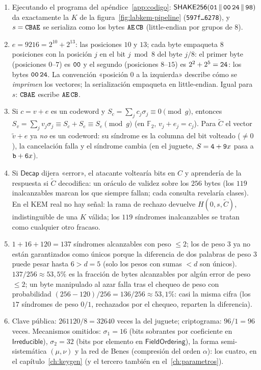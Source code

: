 \documentclass[11pt,a4paper,oneside]{report}
\newcommand{\F}{\mathbb{F}}
\newcommand{\Ftwo}{\F_2}
\newcommand{\hx}[1]{\text{\texttt{#1}}}
\begin{document}
\begin{enumerate}[leftmargin=1.9em,itemsep=4pt]
  \item Ejecutando el programa del apéndice~\ref{app:codigo}:
        $\textsf{SHAKE256}(\hx{01}\,\|\,\hx{00\,24}\,\|\,\hx{98})$
        da exactamente la $K$ de la
        figura~\ref{fig:labkem-pipeline}
        (\texttt{597f\ldots6278}), y $s=\hx{CBAE}$ se serializa
        como los bytes $\hx{AE}\,\hx{CB}$ (little-endian por grupos
        de $8$).
  \item $e=9216=2^{10}+2^{13}$: las posiciones $10$ y $13$; cada
        byte empaqueta $8$ posiciones con la posición $j$ en el bit
        $j\bmod8$ del byte $j/8$: el primer byte
        (posiciones $0$--$7$) es $\hx{00}$ y el segundo
        (posiciones $8$--$15$) es $2^2+2^5=\hx{24}$: los bytes
        $\hx{00}\,\hx{24}$. La convención «posición $0$ a la
        izquierda» describe cómo se \emph{imprimen} los vectores;
        la serialización empaqueta en little-endian. Igual para
        $s$: $\hx{CBAE}$ escribe $\hx{AE}\,\hx{CB}$.
  \item Si $c=v+e$ es un codeword y $S_c=\sum_jc_j\sigma_j\equiv0
        \pmod g$, entonces
        $S_v=\sum_jv_j\sigma_j\equiv S_c+S_e\equiv S_e\pmod g$
        (en $\Ftwo$, $v_j+e_j=c_j$). Para $\tilde C$ el vector
        $\tilde v+e$ ya \emph{no} es un codeword: su síndrome es la
        columna del bit volteado ($\ne0$), la cancelación falla y el
        síndrome cambia (en el juguete, $S=\hx4+\hx9x$ pasa a
        $\hx b+\hx6x$).
  \item Si $\textsf{Decap}$ dijera «error», el atacante voltearía
        bits en $C$ y aprendería de la respuesta si $\tilde C$
        decodifica: un oráculo de validez sobre los $256$ bytes
        (los $119$ inalcanzables marcan los que siempre fallan; cada
        consulta revelaría clases). En el KEM real no hay señal: la
        rama de rechazo devuelve $H(0,s,\tilde C)$, indistinguible
        de una $K$ válida; los $119$ síndromes inalcanzables se
        tratan como cualquier otro fracaso.
  \item $1+16+120=137$ síndromes alcanzables con peso $\le2$; los de
        peso $3$ ya no están garantizados como únicos porque la
        diferencia de dos palabras de peso $3$ puede pesar hasta
        $6>d=5$ (solo los pesos con sumas $<d$ son únicos).
        $137/256\approx53{,}5\%$ es la fracción de bytes alcanzables
        por algún error de peso $\le2$; un byte manipulado al azar
        falla tras el chequeo de peso con probabilidad
        $(256-120)/256=136/256\approx53{,}1\%$: casi la misma cifra
        (los $17$ síndromes de peso $0/1$, rechazados por el
        chequeo, reparten la diferencia).
  \item Clave pública: $\num{261120}/8=\num{32640}$ veces la del
        juguete; criptograma: $96/1=96$ veces. Mecanismos omitidos:
        $\sigma_1=16$ (bits sobrantes por coeficiente en
        $\textsf{Irreducible}$), $\sigma_2=32$ (bits por elemento en
        $\textsf{FieldOrdering}$), la forma semi-sistemática
        $(\mu,\nu)$ y la red de Benes (compresión del orden
        $\alpha$): los cuatro, en el capítulo~\ref{ch:keygen} (y el
        tercero también en el~\ref{ch:parametros}).
\end{enumerate}
\end{document}
